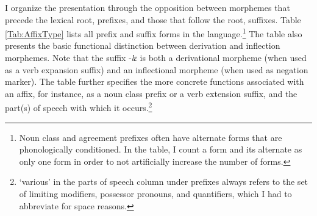 I organize the presentation through the opposition between morphemes that precede the lexical root, prefixes, and those that follow the root, suffixes. Table \ref{Tab:AffixType} lists all prefix and suffix forms in the language.\footnote{Noun class and agreement prefixes often have alternate forms that are phonologically conditioned. In the table, I count a form and its alternate as only one form in order to not artificially increase the number of forms.} The table also presents the basic functional distinction between derivation and inflection morphemes. Note that the suffix -{\itshape lɛ} is both a derivational morpheme (when used as a verb expansion suffix) and an inflectional morpheme (when used as negation marker).  The table further specifies the more concrete functions associated with an affix, for instance, as a noun class prefix or a verb extension suffix,  and the part(s) of speech with which it occurs.\footnote{`various' in the parts of speech column under prefixes always refers to the set of limiting modifiers, possessor pronouns, and quantifiers, which I had to abbreviate for space reasons.}




